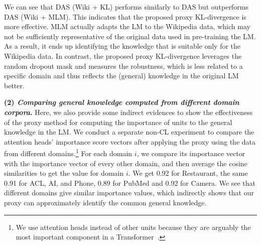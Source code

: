 \documentclass{article} \usepackage{iclr2023_conference,times}
\begin{document}
{We can see that DAS (Wiki + KL) performs similarly to DAS but  outperforms DAS (Wiki + MLM). This indicates that the proposed proxy KL-divergence is more effective. MLM actually adapts the LM to the Wikipedia data, which may not be sufficiently representative of the original data used in pre-training the LM. As a result, it ends up identifying the knowledge that is suitable only for the Wikipedia data. In contrast, the proposed proxy KL-divergence leverages the random dropout mask and measures the robustness, which is less related to a specific domain and thus reflects the (general) knowledge in the original LM better. }



{\color{black}
\textbf{(2) \textit{Comparing general knowledge computed from different domain corpora}.} Here, we also provide some indirect evidences to show the effectiveness of the proxy method for computing the importance of units to the general knowledge in the LM. 
We conduct a separate non-CL experiment to compare the attention heads' importance score vectors  after applying the proxy using the data from different domains.\footnote{{\color{black}We use attention heads instead of other units because they are arguably the most important component in a Transformer~\citep{michel2019sixteen,voita2019analyzing,mccarley2019structured}.}} For each domain $i$, we compare its importance vector with the importance vector of every other domain, and 
then average the cosine similarities to get the value for domain $i$. We get 0.92 for Restaurant, the same 0.91 for ACL, AI, and Phone, 0.89 for PubMed and 0.92 for Camera. We see that different domains give similar importance values, which indirectly shows that our proxy can approximately identify the common general knowledge. 










}
\end{document}
